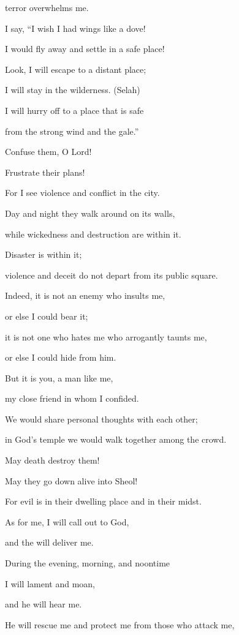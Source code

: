 {\par }{\Q terror
overwhelms me.
\par }{\Q {}I say, “I wish
I had wings
like a dove!
\par }{\Q I would fly
away and settle in a safe place!
\par }{\Q {}Look,
I will escape
to a distant
place;
\par }{\Q I will stay
in the wilderness.
(Selah)
\par }{\Q {}I will hurry off
to a place
that is safe
\par }{\Q from the strong wind
and the gale.”
\par }{\Q {}Confuse
them, O Lord!
\par }{\Q Frustrate
their plans!

\par }{\Q For
I see
violence
and conflict
in the city.
\par }{\Q {}Day
and night
they walk around
on
its walls,
\par }{\Q while wickedness
and destruction
are within it.
\par }{\Q {}Disaster
is within
it;
\par }{\Q violence
and deceit
do not
depart
from its public square.
\par }{\Q {}Indeed,
it is not
an enemy
who insults
me,
\par }{\Q or else I could bear
it;
\par }{\Q it is not
one who hates
me who arrogantly
taunts me,

\par }{\Q or else I could hide
from him.
\par }{\Q {}But it is you,
a man
like me,
\par }{\Q my close friend
in whom I confided.
\par }{\Q {}We would share personal
thoughts
with each other;

\par }{\Q in God’s
temple
we would walk
together
among the crowd.
\par }{\Q {}May death destroy
them!

\par }{\Q May they go down
alive
into Sheol!

\par }{\Q For
evil
is in their dwelling place
and in their midst.
\par }{\Q {}As for me, I
will call
out to
God,
\par }{\Q and the
{}
will deliver me.
\par }{\Q {}During the evening,
morning,
and noontime
\par }{\Q I will lament
and moan,
\par }{\Q and he will hear
me.
\par }{\Q {}He will rescue
me and protect
me from those who attack me,

}
